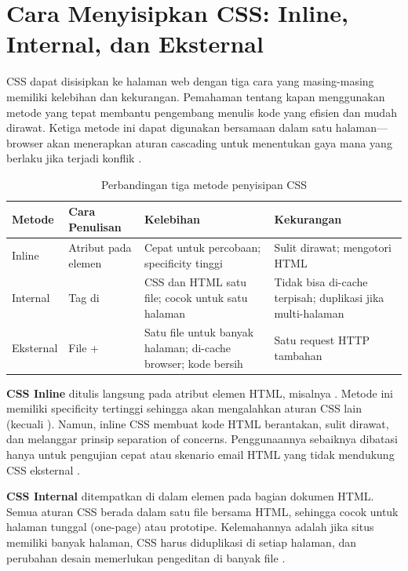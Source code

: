 ﻿\section{Cara Menyisipkan CSS: Inline, Internal, dan Eksternal}

CSS dapat disisipkan ke halaman web dengan tiga cara yang masing-masing memiliki kelebihan dan kekurangan. Pemahaman tentang kapan menggunakan metode yang tepat membantu pengembang menulis kode yang efisien dan mudah dirawat. Ketiga metode ini dapat digunakan bersamaan dalam satu halaman---browser akan menerapkan aturan cascading untuk menentukan gaya mana yang berlaku jika terjadi konflik \cite{mdnCss}.

\begin{table}[H]
\centering
\begin{tabular}{|P{2cm}|P{3cm}|P{3.5cm}|P{3.5cm}|}
\hline
\textbf{Metode} & \textbf{Cara Penulisan} & \textbf{Kelebihan} & \textbf{Kekurangan} \\
\hline
Inline & Atribut  pada elemen & Cepat untuk percobaan; specificity tinggi & Sulit dirawat; mengotori HTML \\
\hline
Internal & Tag  di  & CSS dan HTML satu file; cocok untuk satu halaman & Tidak bisa di-cache terpisah; duplikasi jika multi-halaman \\
\hline
Eksternal & File  +  & Satu file untuk banyak halaman; di-cache browser; kode bersih & Satu request HTTP tambahan \\
\hline
\end{tabular}
\caption{Perbandingan tiga metode penyisipan CSS}
\end{table}

\textbf{CSS Inline} ditulis langsung pada atribut  elemen HTML, misalnya . Metode ini memiliki specificity tertinggi sehingga akan mengalahkan aturan CSS lain (kecuali ). Namun, inline CSS membuat kode HTML berantakan, sulit dirawat, dan melanggar prinsip separation of concerns. Penggunaannya sebaiknya dibatasi hanya untuk pengujian cepat atau skenario email HTML yang tidak mendukung CSS eksternal \cite{webdevCss}.

\textbf{CSS Internal} ditempatkan di dalam elemen  pada bagian  dokumen HTML. Semua aturan CSS berada dalam satu file bersama HTML, sehingga cocok untuk halaman tunggal (one-page) atau prototipe. Kelemahannya adalah jika situs memiliki banyak halaman, CSS harus diduplikasi di setiap halaman, dan perubahan desain memerlukan pengeditan di banyak file \cite{mdnCss}.

